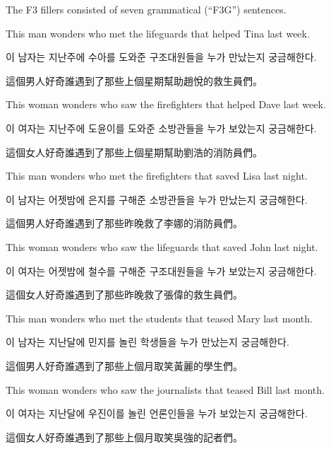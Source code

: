 \vspace{.2cm}

The F3 fillers consisted of seven grammatical (``F3G'') sentences.

\vspace{.2cm}

\pex %
\a[label=E] This man wonders who met the lifeguards that helped Tina last week.\par\nobreak
\a[label=K] \ko 이 남자는 지난주에 수아를 도와준 구조대원들을 누가 만났는지 궁금해한다\normalfont.\par\nobreak
\a[label=M] \zh 這個男人好奇誰遇到了那些上個星期幫助趙悅的救生員們。\normalfont
\xe

\pex %
\a[label=E] This woman wonders who saw the firefighters that helped Dave last week.\par\nobreak
\a[label=K] \ko 이 여자는 지난주에 도윤이를 도와준 소방관들을 누가 보았는지 궁금해한다\normalfont.\par\nobreak
\a[label=M] \zh 這個女人好奇誰遇到了那些上個星期幫助劉浩的消防員們。\normalfont
\xe

\pex %
\a[label=E] This man wonders who met the firefighters that saved Lisa last night.\par\nobreak
\a[label=K] \ko 이 남자는 어젯밤에 은지를 구해준 소방관들을 누가 만났는지 궁금해한다\normalfont.\par\nobreak
\a[label=M] \zh 這個男人好奇誰遇到了那些昨晚救了李娜的消防員們。\normalfont
\xe

\pex %
\a[label=E] This woman wonders who saw the lifeguards that saved John last night.\par\nobreak
\a[label=K] \ko 이 여자는 어젯밤에 철수를 구해준 구조대원들을 누가 보았는지 궁금해한다\normalfont.\par\nobreak
\a[label=M] \zh 這個女人好奇誰遇到了那些昨晚救了張偉的救生員們。\normalfont
\xe

\pex %
\a[label=E] This man wonders who met the students that teased Mary last month.\par\nobreak
\a[label=K] \ko 이 남자는 지난달에 민지를 놀린 학생들을 누가 만났는지 궁금해한다\normalfont.\par\nobreak
\a[label=M] \zh 這個男人好奇誰遇到了那些上個月取笑黃麗的學生們。\normalfont
\xe

\pex %
\a[label=E] This woman wonders who saw the journalists that teased Bill last month.\par\nobreak
\a[label=K] \ko 이 여자는 지난달에 우진이를 놀린 언론인들을 누가 보았는지 궁금해한다\normalfont.\par\nobreak
\a[label=M] \zh 這個女人好奇誰遇到了那些上個月取笑吳強的記者們。\normalfont
\xe

